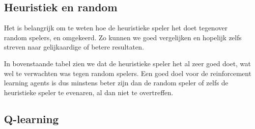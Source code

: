 \documentclass[11pt]{article}
\begin{document}
\subsection{Heuristiek en random}
Het is belangrijk om te weten hoe de heuristieke speler het doet tegenover random spelers, en omgekeerd. Zo kunnen we goed vergelijken en hopelijk zelfs streven naar gelijkaardige of betere resultaten.
\begin{table}[H]
        \centering
        \caption{W/L in \% voor heuristieke agents}
\end{table}
\noindent In bovenstaande tabel zien we dat de heuristieke speler het al zeer goed doet, wat wel te verwachten was tegen random spelers. Een goed doel voor de reinforcement learning agents is dus minstens beter zijn dan de random speler of zelfs de heuristieke speler te evenaren, al dan niet te overtreffen.

\subsection{Q-learning}
\end{document}
